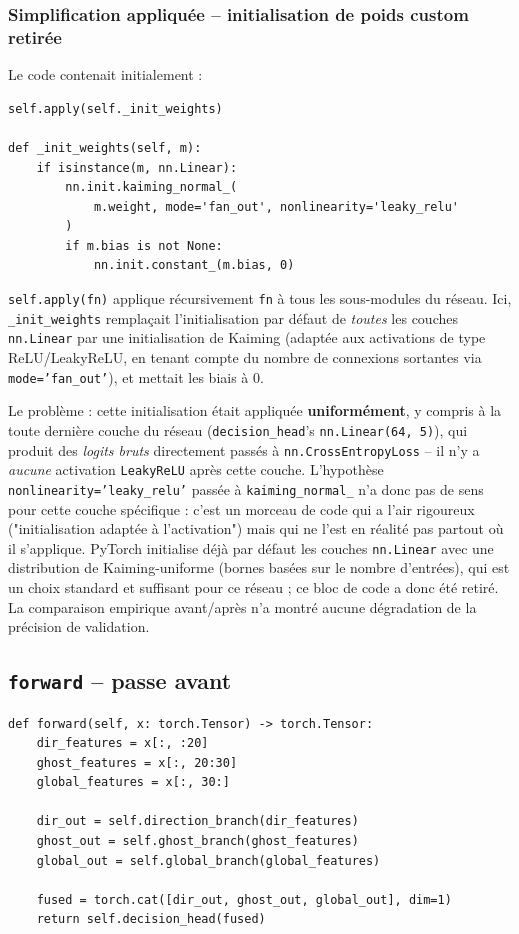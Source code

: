 \documentclass[a4paper,12pt]{article}
\begin{document}
\subsubsection{Simplification appliquée -- initialisation de poids custom retirée}
\label{sec:artifice-init}

Le code contenait initialement :
\begin{lstlisting}
self.apply(self._init_weights)

def _init_weights(self, m):
    if isinstance(m, nn.Linear):
        nn.init.kaiming_normal_(
            m.weight, mode='fan_out', nonlinearity='leaky_relu'
        )
        if m.bias is not None:
            nn.init.constant_(m.bias, 0)
\end{lstlisting}

\texttt{self.apply(fn)} applique récursivement \texttt{fn} à tous les
sous-modules du réseau. Ici, \texttt{\_init\_weights} remplaçait
l'initialisation par défaut de \emph{toutes} les couches
\texttt{nn.Linear} par une initialisation de Kaiming (adaptée aux
activations de type ReLU/LeakyReLU, en tenant compte du nombre de
connexions sortantes via \texttt{mode='fan\_out'}), et mettait les biais
à 0.

Le problème : cette initialisation était appliquée \textbf{uniformément},
y compris à la toute dernière couche du réseau
(\texttt{decision\_head}'s \texttt{nn.Linear(64, 5)}), qui produit des
\emph{logits bruts} directement passés à \texttt{nn.CrossEntropyLoss}
-- il n'y a \emph{aucune} activation \texttt{LeakyReLU} après cette
couche. L'hypothèse \texttt{nonlinearity='leaky\_relu'} passée à
\texttt{kaiming\_normal\_} n'a donc pas de sens pour cette couche
spécifique : c'est un morceau de code qui a l'air rigoureux
("initialisation adaptée à l'activation") mais qui ne l'est en réalité
pas partout où il s'applique. PyTorch initialise déjà par défaut les
couches \texttt{nn.Linear} avec une distribution de Kaiming-uniforme
(bornes basées sur le nombre d'entrées), qui est un choix standard et
suffisant pour ce réseau ; ce bloc de code a donc été retiré. La
comparaison empirique avant/après n'a montré aucune dégradation de la
précision de validation.

\subsection{\texttt{forward} -- passe avant}

\begin{lstlisting}
def forward(self, x: torch.Tensor) -> torch.Tensor:
    dir_features = x[:, :20]
    ghost_features = x[:, 20:30]
    global_features = x[:, 30:]

    dir_out = self.direction_branch(dir_features)
    ghost_out = self.ghost_branch(ghost_features)
    global_out = self.global_branch(global_features)

    fused = torch.cat([dir_out, ghost_out, global_out], dim=1)
    return self.decision_head(fused)
\end{lstlisting}
\end{document}
